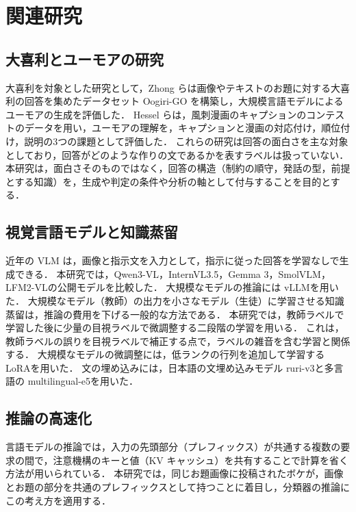 \section{関連研究}
\label{sec_related}
\subsection{大喜利とユーモアの研究}
大喜利を対象とした研究として，Zhong らは画像やテキストのお題に対する大喜利の回答を集めたデータセット Oogiri-GO を構築し，大規模言語モデルによるユーモアの生成を評価した\cite{ref_oogiri_go}．
Hessel らは，風刺漫画のキャプションのコンテストのデータを用い，ユーモアの理解を，キャプションと漫画の対応付け，順位付け，説明の3つの課題として評価した\cite{ref_newyorker}．
これらの研究は回答の面白さを主な対象としており，回答がどのような作りの文であるかを表すラベルは扱っていない．
本研究は，面白さそのものではなく，回答の構造（制約の順守，発話の型，前提とする知識）を，生成や判定の条件や分析の軸として付与することを目的とする．

\subsection{視覚言語モデルと知識蒸留}
近年の VLM は，画像と指示文を入力として，指示に従った回答を学習なしで生成できる．
本研究では，Qwen3-VL\cite{ref_qwen3vl}，InternVL3.5\cite{ref_internvl35}，Gemma 3\cite{ref_gemma3}，SmolVLM\cite{ref_smolvlm}，LFM2-VL\cite{ref_lfm2vl}の公開モデルを比較した．
大規模なモデルの推論には vLLM\cite{ref_vllm}を用いた．
大規模なモデル（教師）の出力を小さなモデル（生徒）に学習させる知識蒸留\cite{ref_kd}は，推論の費用を下げる一般的な方法である．
本研究では，教師ラベルで学習した後に少量の目視ラベルで微調整する二段階の学習を用いる．
これは，教師ラベルの誤りを目視ラベルで補正する点で，ラベルの雑音を含む学習\cite{ref_noisy_student}と関係する．
大規模なモデルの微調整には，低ランクの行列を追加して学習する LoRA\cite{ref_lora}を用いた．
文の埋め込みには，日本語の文埋め込みモデル ruri-v3\cite{ref_ruri}と多言語の multilingual-e5\cite{ref_me5}を用いた．

\subsection{推論の高速化}
言語モデルの推論では，入力の先頭部分（プレフィックス）が共通する複数の要求の間で，注意機構のキーと値（KV キャッシュ）を共有することで計算を省く方法が用いられている\cite{ref_vllm, ref_sglang}．
本研究では，同じお題画像に投稿されたボケが，画像とお題の部分を共通のプレフィックスとして持つことに着目し，分類器の推論にこの考え方を適用する．
